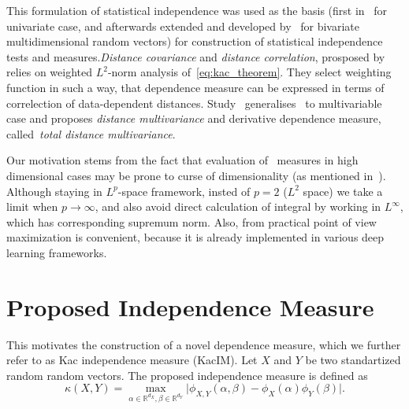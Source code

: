 \documentclass{article}
\begin{document}
This formulation of statistical independence was used as the basis (first in~\cite{Feuerverger} for univariate case, and afterwards extended and developed by~\cite{Szekely} for bivariate multidimensional random vectors) for construction of statistical independence tests and measures.\textit{Distance covariance} and \textit{distance correlation}, prosposed by ~\cite{Szekely} relies on weighted $L^{2}$-norm analysis of~\eqref{eq:kac_theorem}. They select weighting function in such a way, that dependence measure can be expressed in terms of correlection of data-dependent distances. Study~\cite{Bottcher} generalises~\cite{Szekely} to multivariable case and proposes \textit{distance multivariance} and derivative dependence measure, called~\textit{total distance multivariance}. 

Our motivation stems from the fact that evaluation of~\cite{Szekely} measures in high dimensional cases may be prone to curse of dimensionality (as mentioned in~\cite{Edlemann}). Although staying in $L^{p}$-space framework, insted of $p = 2$ ($L^{2}$ space) we take a limit when  $p \rightarrow \infty$, and also avoid direct calculation of integral by working in $L^{\infty}$, which has corresponding supremum norm. Also, from practical point of view maximization is convenient, because it is already implemented in various deep learning frameworks. %

\section{Proposed Independence Measure}
\label{section:proposed_method}



\noindent This motivates the construction of a novel dependence measure, which we further refer to as Kac independence measure (KacIM). Let $X$ and $Y$ be two standartized random random vectors. The proposed independence measure is defined as
\begin{equation}
\label{eq:kim}
    \kappa(X,Y) = \max_{\alpha \in \mathbb{R}^{d_{X}}, \beta \in \mathbb{R}^{d_{Y}}} \vert \phi_{X,Y}(\alpha, \beta)  -\phi_{X}(\alpha) \phi_{Y}(\beta) \vert.
\end{equation}

\end{document}
